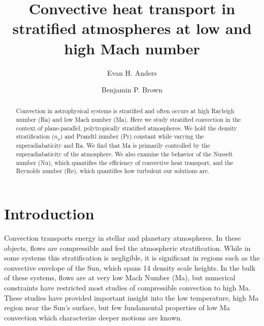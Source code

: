 \documentclass[aps, prl, twocolumn, nofootinbib, groupedaddress, amsfonts, amssymb, amsmath]{revtex4-1}
\newcommand{\RB}{Rayleigh-B\'{e}nard }
\begin{document}
\author{Evan H. Anders}
\author{Benjamin P. Brown}
\title{Convective heat transport in stratified atmospheres at low and high Mach number}

\begin{abstract}
Convection in astrophysical systems is stratified and
often occurs at high Rayleigh number (Ra) and low
Mach number (Ma).
Here we study stratified convection in the context of 
plane-parallel, polytropically stratified atmospheres. 
We hold the density stratification ($n_{\rho}$) and Prandtl 
number (Pr) constant while varying the superadiabaticity
and Ra.  We find that Ma is primarily controlled by the
superadiabaticity of the atmosphere.  We also examine
the behavior of the Nusselt number (Nu), 
which quantifies the efficiency of convective heat transport,
and the Reynolds number (Re), which quantifies how turbulent our
solutions are.
\end{abstract}
\maketitle


\section{Introduction}
\label{sec:intro}
Convection transports energy in stellar and planetary atmospheres.
In these objects, flows are compressible and
feel the atmospheric stratification.  While in some systems this stratification 
is negligible, it is significant in regions such as
the convective envelope of the Sun, which spans 14 density scale heights.
In the bulk of these systems, flows are at very low Mach Number (Ma), 
but numerical constraints have restricted most studies of 
compressible convection to high Ma.
These studies have provided important insight into the low temperature, 
high Ma region near the Sun's surface, but few fundamental
properties of low Ma convection which characterize deeper motions
are known.
\end{document}
